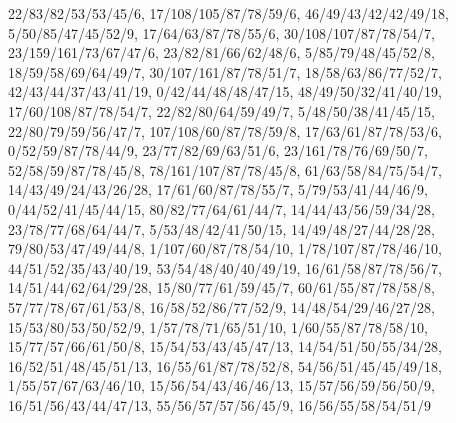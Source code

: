 {22/83/82/53/53/45/6,
17/108/105/87/78/59/6,
46/49/43/42/42/49/18,
5/50/85/47/45/52/9,
17/64/63/87/78/55/6,
30/108/107/87/78/54/7,
23/159/161/73/67/47/6,
23/82/81/66/62/48/6,
5/85/79/48/45/52/8,
18/59/58/69/64/49/7,
30/107/161/87/78/51/7,
18/58/63/86/77/52/7,
42/43/44/37/43/41/19,
0/42/44/48/48/47/15,
48/49/50/32/41/40/19,
17/60/108/87/78/54/7,
22/82/80/64/59/49/7,
5/48/50/38/41/45/15,
22/80/79/59/56/47/7,
107/108/60/87/78/59/8,
17/63/61/87/78/53/6,
0/52/59/87/78/44/9,
23/77/82/69/63/51/6,
23/161/78/76/69/50/7,
52/58/59/87/78/45/8,
78/161/107/87/78/45/8,
61/63/58/84/75/54/7,
14/43/49/24/43/26/28,
17/61/60/87/78/55/7,
5/79/53/41/44/46/9,
0/44/52/41/45/44/15,
80/82/77/64/61/44/7,
14/44/43/56/59/34/28,
23/78/77/68/64/44/7,
5/53/48/42/41/50/15,
14/49/48/27/44/28/28,
79/80/53/47/49/44/8,
1/107/60/87/78/54/10,
1/78/107/87/78/46/10,
44/51/52/35/43/40/19,
53/54/48/40/40/49/19,
16/61/58/87/78/56/7,
14/51/44/62/64/29/28,
15/80/77/61/59/45/7,
60/61/55/87/78/58/8,
57/77/78/67/61/53/8,
16/58/52/86/77/52/9,
14/48/54/29/46/27/28,
15/53/80/53/50/52/9,
1/57/78/71/65/51/10,
1/60/55/87/78/58/10,
15/77/57/66/61/50/8,
15/54/53/43/45/47/13,
14/54/51/50/55/34/28,
16/52/51/48/45/51/13,
16/55/61/87/78/52/8,
54/56/51/45/45/49/18,
1/55/57/67/63/46/10,
15/56/54/43/46/46/13,
15/57/56/59/56/50/9,
16/51/56/43/44/47/13,
55/56/57/57/56/45/9,
16/56/55/58/54/51/9}
\def\BodyMarksA{0.639/-0.307/-0.623/0.26}
\def\BodyTrackA{(0.639,-0.307)--(0.611,-0.296)--(0.578,-0.282)--(0.54,-0.265)--(0.496,-0.246)--(0.447,-0.224)--(0.394,-0.201)--(0.338,-0.176)--(0.278,-0.149)--(0.218,-0.122)--(0.157,-0.094)--(0.095,-0.066)--(0.035,-0.039)--(-0.024,-0.012)--(-0.082,0.015)--(-0.137,0.04)--(-0.19,0.064)--(-0.242,0.088)--(-0.295,0.112)--(-0.35,0.137)--(-0.408,0.163)--(-0.468,0.19)--(-0.527,0.216)--(-0.58,0.24)--(-0.623,0.26)}
